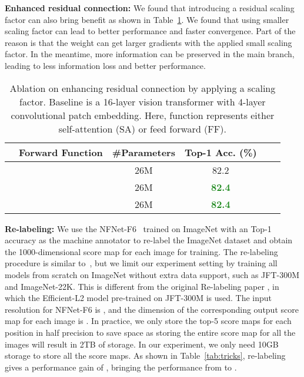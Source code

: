 \documentclass[10pt,twocolumn,letterpaper]{article}
\newcommand{\highlight}[1]{\textcolor{ForestGreen}{\textbf{#1}}}
\newcommand{\myPara}[1]{\vspace{.05in}\noindent\textbf{#1:}}
\begin{document}
\myPara{Enhanced residual connection}
We found that introducing a residual scaling factor can also bring benefit 
as shown in Table~\ref{tab:abl_res}.
We found that using smaller scaling factor can lead to better performance and faster convergence.
Part of the reason is that the weight can get larger gradients with the applied small scaling factor.
In the meantime, more information can be preserved in the main branch, leading to less information loss 
and better performance.

\begin{table}[t]
  \centering
  \small
  \setlength\tabcolsep{2.6mm}
  \renewcommand\arraystretch{1}
  \caption{Ablation on enhancing residual connection by applying a scaling factor. 
  Baseline is a 16-layer vision transformer with 4-layer convolutional patch embedding. 
  Here, function  represents either self-attention (SA) or feed forward (FF).}
  
  \label{tab:abl_res}
  \begin{tabular}{lccccc} \toprule[0.5pt]
    &Forward Function & \#Parameters & Top-1 Acc. (\%) \\ \midrule[0.5pt] \midrule[0.5pt]
      &   &26M &  82.2\\
     &  &26M &  \highlight{\textbf{82.4}}\\ 
     &  &26M &  \highlight{\textbf{82.4}}\\

    \bottomrule[0.5pt]
  \end{tabular}
\end{table}
\myPara{Re-labeling}
We use the NFNet-F6~\cite{brock2021high} trained on ImageNet with an  Top-1 accuracy 
as the machine annotator to re-label the ImageNet dataset and obtain the 1000-dimensional score map
for each image for training.
The re-labeling procedure is similar to~\cite{yun2021relabel}, but we limit our experiment setting
by training all models from scratch on ImageNet without extra data support, such as JFT-300M and ImageNet-22K.
This is different from the original Re-labeling paper \cite{yun2021relabel}, in which the Efficient-L2
model pre-trained on JFT-300M is used.
The input resolution for NFNet-F6 is , and the dimension of the corresponding output score map
for each image is . 
In practice, we only store the top-5 score maps for each position in half precision to save space 
as storing the entire score map for all the images will result in 2TB of storage.
In our experiment, we only need 10GB storage to store all the score maps.
As shown in Table~\ref{tab:tricks}, re-labeling gives a performance gain of , bringing the performance
from  to .
\end{document}
